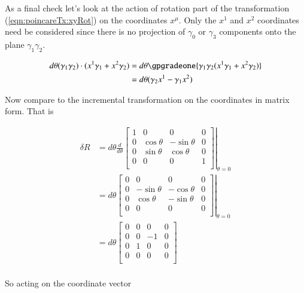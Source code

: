 As a final check let's look at the action of rotation part of the transformation (\ref{eqn:poincareTx:xyRot}) on the coordinates $x^\mu$.  Only the $x^1$ and $x^2$ coordinates need be considered since there is no projection of $\gamma_0$ or $\gamma_3$ components onto the plane $\gamma_1 \gamma_2$.

\begin{align*}
d\theta (\gamma_1 \gamma_2) \cdot (x^1 \gamma_1 + x^2 \gamma_2)
&= 
d\theta \gpgradeone{ \gamma_1 \gamma_2 (x^1 \gamma_1 + x^2 \gamma_2) } \\
&= 
d\theta (\gamma_2 x^1 - \gamma_1 x^2)  \\
\end{align*}

Now compare to the incremental transformation on the coordinates in matrix form.  That is

\begin{align*}
\delta R
&=
d\theta \frac{d}{d\theta}
{
\left.
\begin{bmatrix}
1 & 0 & 0 & 0 \\
0 & \cos\theta & -\sin\theta & 0 \\
0 & \sin\theta & \cos\theta & 0 \\
0 & 0 & 0 & 1 \\
\end{bmatrix}
\right\vert}_{\theta=0} \\
&=
d\theta
{
\left.
\begin{bmatrix}
0 & 0 & 0 & 0 \\
0 & -\sin\theta & -\cos\theta & 0 \\
0 & \cos\theta & -\sin\theta & 0 \\
0 & 0 & 0 & 0 \\
\end{bmatrix}
\right\vert}_{\theta=0} \\
&=
d\theta
\begin{bmatrix}
0 & 0 & 0 & 0 \\
0 & 0 & -1 & 0 \\
0 & 1 & 0 & 0 \\
0 & 0 & 0 & 0 \\
\end{bmatrix} \\
\end{align*}

So acting on the coordinate vector

